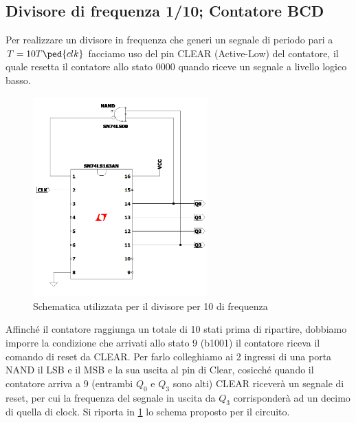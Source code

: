 \documentclass[10pt, a4paper, italian]{article}
\begin{document}
\subsection{Divisore di frequenza 1/10; Contatore BCD}
Per realizzare un divisore in frequenza che generi un segnale di periodo pari
a $T = 10 T\ped{clk}$ facciamo uso del pin CLEAR (Active-Low) del contatore,
il quale resetta il contatore allo stato $0000$ quando riceve un segnale a
livello logico basso.
\begin{figure}[htbp]
\centering
	\includegraphics[width=0.6\textwidth]{Draft1}
	\caption{Schematica utilizzata per il divisore per 10 di frequenza
	\label{schem: 10_div}}
\end{figure}

Affinché il contatore raggiunga un totale di 10 stati prima di ripartire,
dobbiamo imporre la condizione che arrivati allo stato $9$ (b1001) il
contatore riceva il comando di reset da CLEAR.
Per farlo colleghiamo ai 2 ingressi di una porta NAND il LSB e il MSB e
la sua uscita al pin di Clear, cosicché quando il contatore arriva a 9
(entrambi $Q_0$ e $Q_3$ sono alti) CLEAR riceverà un segnale di reset,
per cui la frequenza del segnale in uscita da $Q_3$ corrisponderà ad un decimo
di quella di clock. Si riporta in \cref{schem: 10_div} lo schema proposto per
il circuito.
\end{document}
